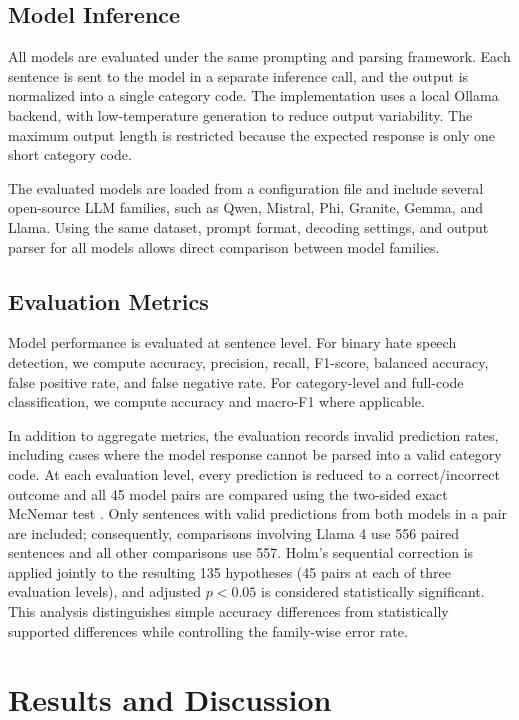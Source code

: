 \documentclass[a4paper]{article}
\begin{document}
\subsection{Model Inference}

All models are evaluated under the same prompting and parsing framework. Each sentence is sent to the model in a separate inference call, and the output is normalized into a single category code. The implementation uses a local Ollama backend, with low-temperature generation to reduce output variability. The maximum output length is restricted because the expected response is only one short category code.

The evaluated models are loaded from a configuration file and include several open-source LLM families, such as Qwen, Mistral, Phi, Granite, Gemma, and Llama. Using the same dataset, prompt format, decoding settings, and output parser for all models allows direct comparison between model families.

\subsection{Evaluation Metrics}

Model performance is evaluated at sentence level. For binary hate speech detection, we compute accuracy, precision, recall, F1-score, balanced accuracy, false positive rate, and false negative rate. For category-level and full-code classification, we compute accuracy and macro-F1 where applicable.

In addition to aggregate metrics, the evaluation records invalid prediction rates, including cases where the model response cannot be parsed into a valid category code. At each evaluation level, every prediction is reduced to a correct/incorrect outcome and all 45 model pairs are compared using the two-sided exact McNemar test \cite{mcnemar1947note}. Only sentences with valid predictions from both models in a pair are included; consequently, comparisons involving Llama 4 use 556 paired sentences and all other comparisons use 557. Holm's sequential correction \cite{holm1979simple} is applied jointly to the resulting 135 hypotheses (45 pairs at each of three evaluation levels), and adjusted $p<0.05$ is considered statistically significant. This analysis distinguishes simple accuracy differences from statistically supported differences while controlling the family-wise error rate.

\section{Results and Discussion}
\end{document}
